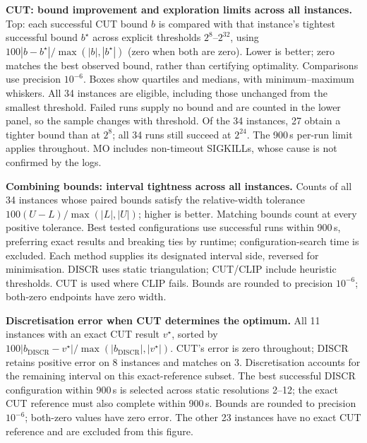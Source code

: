 \documentclass[fontsize=10pt,paper=b5,twoside,DIV=11,BCOR=9mm,
    headinclude=true,footinclude=false]{scrartcl}
\newcommand{\checkplot}[3]{%
  \par\begingroup\centering
    {\footnotesize #2}\par\medskip
    \parbox{\linewidth}{\small\textbf{#1} #3\par}%
  \endgroup\clearpage
}
\begin{document}
\checkplot{CUT: bound improvement and exploration limits across all instances.}{%
}{%
  Top: each successful CUT bound $b$ is compared with that instance's tightest
  successful bound $b^\star$ across explicit thresholds $2^8$--$2^{32}$, using
  $100|b-b^\star|/\max(|b|,|b^\star|)$ (zero when both are zero).
  Lower is better; zero matches the best observed bound, rather than certifying
  optimality. Comparisons use precision $10^{-6}$. Boxes show quartiles and
  medians, with minimum--maximum whiskers. All 34 instances are eligible,
  including those unchanged from the smallest threshold. Failed runs supply no
  bound and are counted in the lower panel, so the sample changes with threshold.
  Of the 34 instances, 27 obtain a tighter bound than at $2^8$; all 34 runs
  still succeed at $2^{24}$. The 900\,s per-run limit applies throughout.
  MO includes non-timeout SIGKILLs, whose cause is not confirmed by the logs.
}
\checkplot{Combining bounds: interval tightness across all instances.}{%
}{%
  Counts of all 34 instances whose paired bounds satisfy the relative-width
  tolerance $100(U-L)/\max(|L|,|U|)$; higher is better. Matching bounds count at
  every positive tolerance. Best tested configurations use successful runs
  within 900\,s, preferring exact results and breaking ties by runtime;
  configuration-search time is excluded. Each method supplies its designated
  interval side, reversed for minimisation. DISCR uses static triangulation;
  CUT/CLIP include heuristic thresholds. CUT is used where CLIP fails.
  Bounds are rounded to precision $10^{-6}$; both-zero endpoints have zero width.
}
\checkplot{Discretisation error when CUT determines the optimum.}{%
}{%
  All 11 instances with an exact CUT result $v^\star$, sorted by
  $100|b_{\mathrm{DISCR}}-v^\star|/\max(|b_{\mathrm{DISCR}}|,|v^\star|)$.
  CUT's error is zero throughout; DISCR retains positive error on 8 instances
  and matches on 3. Discretisation accounts for the remaining interval on this
  exact-reference subset. The best successful DISCR configuration within
  900\,s is selected across static resolutions 2--12; the exact CUT
  reference must also complete within 900\,s. Bounds are rounded to precision
  $10^{-6}$; both-zero values have zero error. The other 23 instances have no
  exact CUT reference and are excluded from this figure.
}
\end{document}
